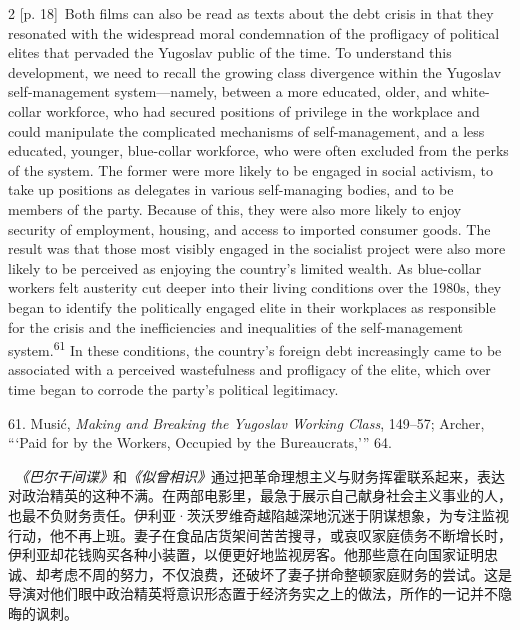 \documentclass[10pt,a4paper]{article}
\begin{document}
\begin{paracol}{2}
{\scriptsize\color{gray} [p. 18]}\ Both films can also be read as texts about the debt crisis in that they resonated with the widespread moral condemnation of the profligacy of political elites that pervaded the Yugoslav public of the time. To understand this development, we need to recall the growing class divergence within the Yugoslav self-management system—namely, between a more educated, older, and white-collar workforce, who had secured positions of privilege in the workplace and could manipulate the complicated mechanisms of self-management, and a less educated, younger, blue-collar workforce, who were often excluded from the perks of the system. The former were more likely to be engaged in social activism, to take up positions as delegates in various self-managing bodies, and to be members of the party. Because of this, they were also more likely to enjoy security of employment, housing, and access to imported consumer goods. The result was that those most visibly engaged in the socialist project were also more likely to be perceived as enjoying the country’s limited wealth. As blue-collar workers felt austerity cut deeper into their living conditions over the 1980s, they began to identify the politically engaged elite in their workplaces as responsible for the crisis and the inefficiencies and inequalities of the self-management system.\nobreak\textsuperscript{61} In these conditions, the country’s foreign debt increasingly came to be associated with a perceived wastefulness and profligacy of the elite, which over time began to corrode the party’s political legitimacy.\par{\small 61. Musić, \textit{Making and Breaking the Yugoslav Working Class}, 149–57; Archer, “‘Paid for by the Workers, Occupied by the Bureaucrats,’” 64.\par}
\switchcolumn*
{\scriptsize\color{gray} [p. 18]}\ \textit{《巴尔干间谍》}和\textit{《似曾相识》}通过把革命理想主义与财务挥霍联系起来，表达对政治精英的这种不满。在两部电影里，最急于展示自己献身社会主义事业的人，也最不负财务责任。伊利亚·茨沃罗维奇越陷越深地沉迷于阴谋想象，为专注监视行动，他不再上班。妻子在食品店货架间苦苦搜寻，或哀叹家庭债务不断增长时，伊利亚却花钱购买各种小装置，以便更好地监视房客。他那些意在向国家证明忠诚、却考虑不周的努力，不仅浪费，还破坏了妻子拼命整顿家庭财务的尝试。这是导演对他们眼中政治精英将意识形态置于经济务实之上的做法，所作的一记并不隐晦的讽刺。\par
\switchcolumn

\end{paracol}
\end{document}
